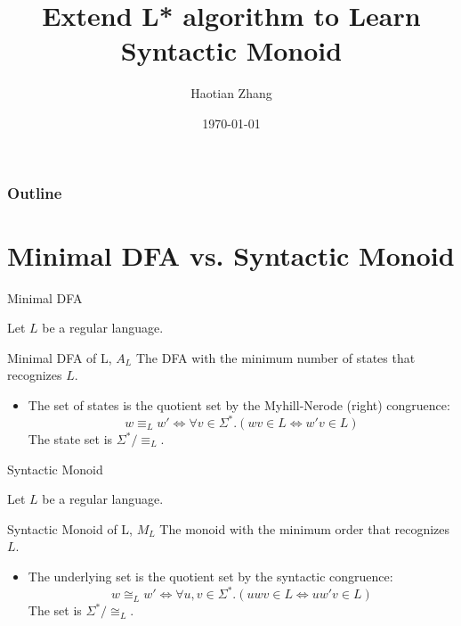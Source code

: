 \documentclass{beamer}
\title{Extend L* algorithm to Learn Syntactic Monoid}
\author{Haotian Zhang}
\date{\today}
\begin{document}
    
\frame{\titlepage}



\begin{frame}
    \frametitle{Outline}
    
    \tableofcontents
\end{frame}


\section{Minimal DFA vs. Syntactic Monoid}
\begin{frame}{Minimal DFA}

{\small Let $L$ be a regular language.}

\begin{block}{Minimal DFA of L, $A_L$}
    {\small The DFA with the minimum number of states that recognizes $L$.}
\begin{itemize}
    \item The set of states is the quotient set by the Myhill-Nerode (right) congruence:
    $$ w \equiv_{L} w' \iff \forall v \in \Sigma^*. (wv \in L \iff w'v \in L) $$
    The state set is $\Sigma^* / \equiv_L$.
\end{itemize}
\end{block}
\end{frame}

\begin{frame}{Syntactic Monoid}

{\small Let $L$ be a regular language.}
\begin{block}{Syntactic Monoid of L, $M_L$}
The monoid with the minimum order that recognizes $L$.
\begin{itemize}
    \item The underlying set is the quotient set by the syntactic congruence:
    $$ w \cong_{L} w' \iff \forall u, v \in \Sigma^*. (uwv \in L \iff uw'v \in L) $$
    The set is $\Sigma^* / \cong_L$.
\end{itemize}
\end{block}
\end{frame}
\end{document}
